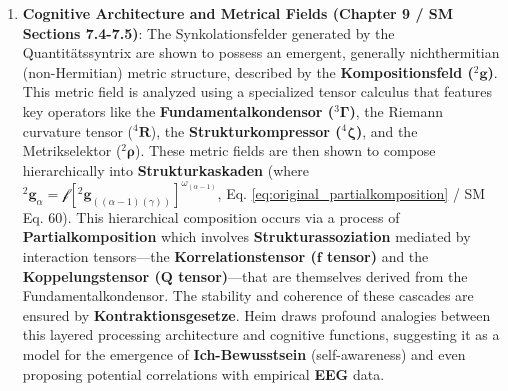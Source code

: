 \documentclass[
    12pt,              %
    a4paper,           %
    headings=normal,   %
    twoside=true,      %
    BCOR=8mm,          %
]{scrbook}
\newcommand{\kompositionsfeld}{{}^2\mathbf{g}}
\newcommand{\partialstruktur}[1]{{}^2\mathbf{g}_{(#1)}}
\newcommand{\fundamentalkondensor}{{}^3\bm{\Gamma}}
\newcommand{\korrelationstensor}{\mathbf{f}}
\newcommand{\koppelungstensor}{\mathbf{Q}}
\newcommand{\strukturkompressor}{{}^4\bm{\zeta}}
\begin{document}
\begin{enumerate}
    \item \textbf{Cognitive Architecture and Metrical Fields (Chapter 9 / SM Sections 7.4-7.5)}: The Synkolationsfelder generated by the Quantitätssyntrix are shown to possess an emergent, generally nichthermitian (non-Hermitian) metric structure, described by the \textbf{Kompositionsfeld (\( \kompositionsfeld \))}. This metric field is analyzed using a specialized tensor calculus that features key operators like the \textbf{Fundamentalkondensor (\( \fundamentalkondensor \))}, the Riemann curvature tensor (\( {}^4\mathbf{R} \)), the \textbf{Strukturkompressor (\( \strukturkompressor \))}, and the Metrikselektor (\( {}^2\bm{\rho} \)). These metric fields are then shown to compose hierarchically into \textbf{Strukturkaskaden} (where \( \kompositionsfeld_\alpha = \mathcal{f}[\partialstruktur{(\alpha-1)(\gamma)}]^{\omega_{(\alpha-1)}} \), Eq. \eqref{eq:original_partialkomposition} / SM Eq. 60). This hierarchical composition occurs via a process of \textbf{Partialkomposition} which involves \textbf{Strukturassoziation} mediated by interaction tensors—the \textbf{Korrelationstensor (\( \korrelationstensor \) tensor)} and the \textbf{Koppelungstensor (\( \koppelungstensor \) tensor)}—that are themselves derived from the Fundamentalkondensor. The stability and coherence of these cascades are ensured by \textbf{Kontraktionsgesetze}. Heim draws profound analogies between this layered processing architecture and cognitive functions, suggesting it as a model for the emergence of \textbf{Ich-Bewusstsein} (self-awareness) and even proposing potential correlations with empirical \textbf{EEG} data.


\end{enumerate}
\end{document}
